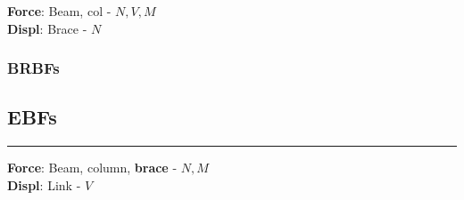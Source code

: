 \textbf{Force}: Beam, col - \(N,V,M\)\\
\textbf{Displ}: Brace - \(N\)

\hypertarget{brbfs}{%
\subsubsection{BRBFs}\label{brbfs}}

\hypertarget{ebfs}{%
\subsection{EBFs}\label{ebfs}}

\begin{center}\rule{0.5\linewidth}{0.5pt}\end{center}

\textbf{Force}: Beam, column, \textbf{brace} - \(N,M\)\\
\textbf{Displ}: Link - \(V\)
